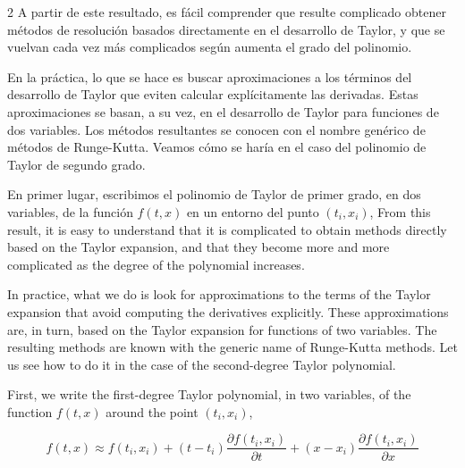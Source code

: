 \begin{paracol}{2}
A partir de este resultado, es fácil comprender que resulte complicado obtener métodos de resolución basados directamente en el desarrollo de Taylor, y que se vuelvan cada vez más complicados según aumenta el grado del polinomio.

En la práctica, lo que se hace es buscar aproximaciones a los términos del desarrollo de Taylor que eviten calcular explícitamente las derivadas. Estas aproximaciones se basan, a su vez, en el desarrollo de Taylor para funciones de dos variables. Los métodos resultantes se conocen con el nombre genérico de métodos de Runge-Kutta. Veamos cómo se haría en el caso del polinomio de Taylor de segundo grado.

En primer lugar, escribimos el polinomio de Taylor de primer grado, en dos variables, de la función $f(t,x)$ en un entorno del punto $(t_i,x_i)$,
\switchcolumn
From this result, it is easy to understand that it is complicated to obtain methods directly based on the Taylor expansion, and that they become more and more complicated as the degree of the polynomial increases.

In practice, what we do is look for approximations to the terms of the Taylor expansion that avoid computing the derivatives explicitly. These approximations are, in turn, based on the Taylor expansion for functions of two variables. The resulting methods are known with the generic name of Runge-Kutta methods. Let us see how to do it in the case of the second-degree Taylor polynomial.

First, we write the first-degree Taylor polynomial, in two variables, of the function $f(t,x)$ around the point $(t_i,x_i)$,
\end{paracol}

\begin{equation*}
f(t,x)\approx f(t_i,x_i)+(t-t_i)\frac{\partial f(t_i,x_i)}{\partial t}+(x-x_i)\frac{\partial f(t_i,x_i)}{\partial x}
\end{equation*}

